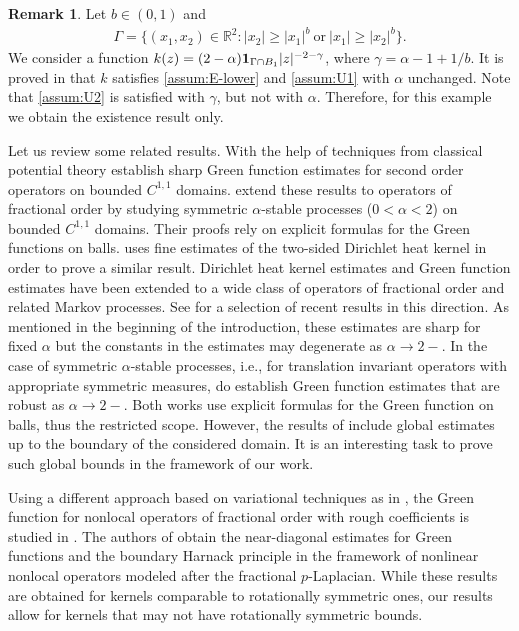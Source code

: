 \documentclass[reqno]{amsart}
\theoremstyle{plain}
\theoremstyle{definition}
\newtheorem{remark}[theorem]{Remark}
\numberwithin{equation}{section}
\newcommand{\R}{\mathbb{R}}
\begin{document}
\begin{remark}
Let $b \in (0,1)$ and
\begin{align*}
\Gamma = \lbrace (x_1, x_2) \in \R^2 : |x_2| \geq |x_1|^b
~\text{or}~ |x_1| \geq |x_2|^b \rbrace.
\end{align*}
We consider a function $k(z) = (2-\alpha) {\bf 1}_{\Gamma \cap B_1} |z|^{-2-\gamma}$,
where $\gamma = \alpha - 1 + 1/b$. 
It is proved in \cite[Example 6.15]{DyKa20} that $k$ satisfies \eqref{assum:E-lower} and \eqref{assum:U1} with $\alpha$ unchanged. Note that \eqref{assum:U2} is satisfied with $\gamma$, but not with $\alpha$. Therefore, for this example we obtain the existence result only.
\end{remark}

Let us review some related results. With the help of techniques from classical potential theory \cite{LSW63,GrWi82,Zha86} establish sharp Green function estimates for second order operators on bounded $C^{1,1}$ domains. \cite{Kul97,ChSo98} extend these results to operators of fractional order by studying symmetric $\alpha$-stable processes ($0 < \alpha < 2$) on bounded $C^{1,1}$ domains. Their proofs rely on  explicit formulas for the Green functions on balls. \cite{CKS10a} uses fine estimates of the two-sided Dirichlet heat kernel in order to prove a similar result. Dirichlet heat kernel estimates and Green function estimates have been extended to a wide class of operators of fractional order and related Markov processes. See \cite{CKSV12, CKS14, BGR14, KiMi14, GKK20} for a selection of recent results in this direction. As mentioned in the beginning of the introduction, these estimates are sharp for fixed $\alpha$ but the constants in the estimates may degenerate as $\alpha \to 2-$. 
In the case of symmetric $\alpha$-stable processes, i.e., for translation invariant operators with appropriate symmetric measures, \cite{Che99,ChSo04} do establish Green function estimates that are robust as $\alpha \to 2-$. Both works use explicit formulas for the Green function on balls, thus the restricted scope. However, the results of \cite{Che99,ChSo04} include global estimates up to the boundary of the considered domain. It is an interesting task to prove such global bounds in the framework of our work.

Using a different approach based on variational techniques as in \cite{LSW63,GrWi82}, the Green function for nonlocal operators of fractional order with rough coefficients is studied in \cite{KaSt02,KMS15,CaSi18}. The authors of \cite{CaSi18} obtain the near-diagonal estimates for Green functions and the boundary Harnack principle in the framework of nonlinear nonlocal operators modeled after the fractional $p$-Laplacian. While these results are obtained for kernels comparable to rotationally symmetric ones, our results allow for kernels that may not have rotationally symmetric bounds. 
\end{document}
